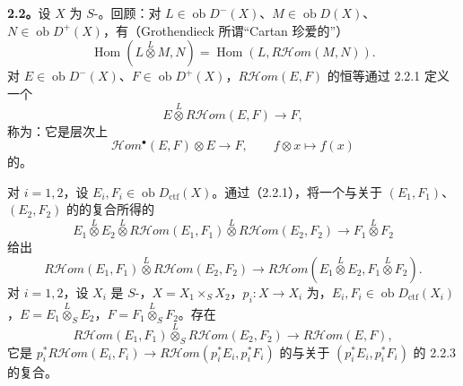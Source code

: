 \textbf{2.2。}设 $X$ 为 $S$-。回顾：对 $L\in\operatorname{ob}D^-(X)$、$M\in\operatorname{ob}D(X)$、$N\in\operatorname{ob}D^+(X)$，有（Grothendieck 所谓“Cartan 珍爱的”）
\[
\operatorname{Hom}(L\mathbin{\overset L\otimes}M,N)=\operatorname{Hom}(L,R\mathcal Hom(M,N)).\tag{2.2.1}
\]
对 $E\in\operatorname{ob}D^-(X)$、$F\in\operatorname{ob}D^+(X)$，$R\mathcal Hom(E,F)$ 的恒等通过 2.2.1 定义一个
\[
E\mathbin{\overset L\otimes}R\mathcal Hom(E,F)\longrightarrow F,\tag{2.2.2}
\]
称为：它是层次上
\[
\mathcal Hom^\bullet(E,F)\otimes E\longrightarrow F,\qquad f\otimes x\longmapsto f(x)
\]
的。

对 $i=1,2$，设 $E_i,F_i\in\operatorname{ob}D_{\mathrm{ctf}}(X)$。通过（2.2.1），将一个与关于 $(E_1,F_1)$、$(E_2,F_2)$ 的的复合所得的
\[
E_1\mathbin{\overset L\otimes}E_2\mathbin{\overset L\otimes}R\mathcal Hom(E_1,F_1)
\mathbin{\overset L\otimes}R\mathcal Hom(E_2,F_2)\longrightarrow F_1\mathbin{\overset L\otimes}F_2
\]
给出
\[
R\mathcal Hom(E_1,F_1)\mathbin{\overset L\otimes}R\mathcal Hom(E_2,F_2)
\longrightarrow R\mathcal Hom(E_1\mathbin{\overset L\otimes}E_2,F_1\mathbin{\overset L\otimes}F_2).\tag{2.2.3}
\]
对 $i=1,2$，设 $X_i$ 是 $S$-，$X=X_1\times_S X_2$，$p_i:X\to X_i$ 为，$E_i,F_i\in\operatorname{ob}D_{\mathrm{ctf}}(X_i)$，$E=E_1\mathbin{\overset L\otimes}_S E_2$，$F=F_1\mathbin{\overset L\otimes}_S F_2$。存在
\[
R\mathcal Hom(E_1,F_1)\mathbin{\overset L\otimes}_S R\mathcal Hom(E_2,F_2)\longrightarrow R\mathcal Hom(E,F),\tag{2.2.4}
\]
它是 $p_i^*R\mathcal Hom(E_i,F_i)\to R\mathcal Hom(p_i^*E_i,p_i^*F_i)$ 的与关于 $(p_i^*E_i,p_i^*F_i)$ 的 2.2.3 的复合。

